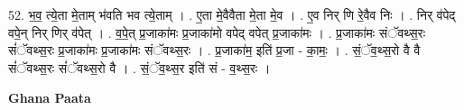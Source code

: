 \documentclass[17pt]{extarticle}
\begin{document}
52. भ॒व॒ त्ये॒ता मे॒ताम् भ॑वति भव त्ये॒ताम् । . ए॒ता मे॒वैवैता मे॒ता मे॒व । . ए॒व निर् णि रे॒वैव निः । . निर् व॑पेद् वपे॒न् निर् णिर् व॑पेत् । . व॒पे॒त् प्र॒जाका॑मः प्र॒जाका॑मो वपेद् वपेत् प्र॒जाका॑मः । . प्र॒जाका॑मः संॅवथ्स॒रः सं॑ॅवथ्स॒रः प्र॒जाका॑मः प्र॒जाका॑मः संॅवथ्स॒रः । . प्र॒जाका॑म॒ इति॑ प्र॒जा - का॒मः॒ । . सं॒ॅव॒थ्स॒रो वै वै सं॑ॅवथ्स॒रः सं॑ॅवथ्स॒रो वै । . सं॒ॅव॒थ्स॒र इति॑ सं - व॒थ्स॒रः । \newline

\textbf{Ghana Paata } \newline
\end{document}
